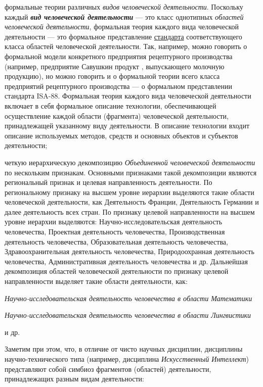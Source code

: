 \begin{scnsubstruct}
{\begin{scnitemize}
            \item формальные теории различных \textit{видов человеческой деятельности}. Поскольку каждый \textbf{\textit{вид человеческой деятельности}} --- это класс однотипных \textit{областей человеческой деятельности}, формальная теория каждого вида человеческой деятельности --- это формальное представление \underline{стандарта} соответствующего класса областей человеческой деятельности. Так, например, можно говорить о формальной модели конкретного предприятия рецептурного производства (например, предприятие Савушкин продукт , выпускающего молочную продукцию), но можно говорить и о формальной теории всего класса предприятий рецептурного производства --- о формальном представлении стандарта ISA-88. Формальная теория каждого вида человеческой деятельности включает в себя формальное описание технологии, обеспечивающей осуществление каждой области (фрагмента) человеческой деятельности, принадлежащей указанному виду деятельности. В описание технологии входит описание используемых методов, средств и основных объектов и субъектов деятельности;
            \item четкую иерархическую декомпозицию \textit{Объединенной человеческой деятельности} по нескольким признакам. Основными признаками такой декомпозиции являются региональный признак и целевая направленность деятельности. По региональному признаку на высшем уровне иерархии выделяются такие области человеческой деятельности, как Деятельность Франции, Деятельность Германии и далее деятельность всех стран. По признаку целевой направленности на высшем уровне иерархии выделяются: Научно-исследовательская деятельность человечества, Проектная деятельность человечества, Производственная деятельность человечества, Образовательная деятельность человечества, Здравоохранительная деятельность человечества, Природоохранная деятельность человечества, Административная деятельность человечества и др. Дальнейшая декомпозиция областей человеческой деятельности по признаку целевой направленности выделяет такие области деятельности, как:
            \begin{scnitemizeii}
                \item \textit{Научно-исследовательская деятельность человечества в области Математики}
                \item \textit{Научно-исследовательская деятельность человечества в области Лингвистики}
                \item и др.
            \end{scnitemizeii}
            Заметим при этом, что, в отличие от чисто научных дисциплин, дисциплины научно-технического типа (например, дисциплина \textit{Искусственный Интеллект}) представляют собой симбиоз фрагментов (областей) деятельности, принадлежащих разным видам деятельности:

\end{scnitemize}}
\end{scnsubstruct}
